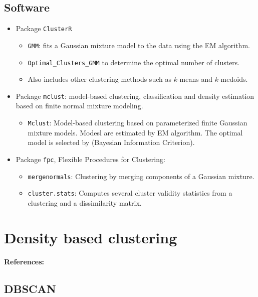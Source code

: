 \subsection{Software}
\begin{itemize}
	\item Package \texttt{ClusterR}
	      \begin{itemize}
		      \item \texttt{GMM}: fits a Gaussian mixture model to the data using the EM algorithm.
		      \item \texttt{Optimal\_Clusters\_GMM} to determine the optimal number of clusters.
		      \item Also includes other clustering methods such as $k$-means and $k$-medoids.
	      \end{itemize}
	\item Package \texttt{mclust}: model-based clustering, classification and density estimation
        based on finite normal mixture modeling.
	      \begin{itemize}
		      \item \texttt{Mclust}: Model-based clustering based on parameterized finite
                  Gaussian mixture models. Modesl are estimated by EM algorithm. The optimal
                  model is selected by  (Bayesian Information Criterion).
	      \end{itemize}
	\item Package \texttt{fpc}, Flexible Procedures for Clustering:
	      \begin{itemize}
		      \item \texttt{mergenormals}: Clustering by merging components of a Gaussian mixture.
		      \item \texttt{cluster.stats}: Computes several cluster validity statistics from a
		            clustering and a dissimilarity matrix.
	      \end{itemize}
\end{itemize}

\pagebreak
\section{Density based clustering}
\paragraph{References:} \cite{ester_density-based_1996}
\subsection{DBSCAN}

